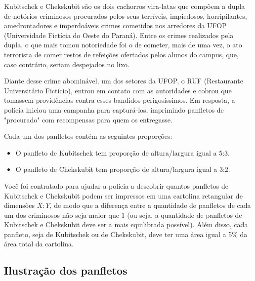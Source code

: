 Kubitschek e Chekskubit são os dois cachorros vira-latas que compõem a dupla de notórios criminosos procurados pelos seus terríveis, impiedosos, horripilantes, amedrontadores e imperdoáveis crimes cometidos nos arredores da UFOP (Universidade Fictícia do Oeste do Paraná). Entre os crimes realizados pela dupla, o que mais tomou notoriedade foi o de cometer, mais de uma vez, o ato terrorista de comer restos de refeições ofertados pelos alunos do campus, que, caso contrário, seriam despejados no lixo.

Diante desse crime abominável, um dos setores da UFOP, o RUF (Restaurante Universitário Fictício), entrou em contato com as autoridades e cobrou que tomassem providências contra esses bandidos perigosíssimos. Em resposta, a polícia iniciou uma campanha para capturá-los, imprimindo panfletos de "procurado" com recompensas para quem os entregasse.

Cada um dos panfletos contém as seguintes proporções:
\begin{itemize}
    \item O panfleto de Kubitschek tem proporção de altura/largura igual a 5:3.
    \item O panfleto de Chekskubit tem proporção de altura/largura igual a 3:2.
\end{itemize}

Você foi contratado para ajudar a polícia a descobrir quantos panfletos de Kubitschek e Chekskubit podem ser impressos em uma cartolina retangular de dimensões $X:Y$, de modo que a diferença entre a quantidade de panfletos de cada um dos criminosos não seja maior que 1 (ou seja, a quantidade de panfletos de Kubitschek e Chekskubit deve ser a mais equilibrada possível). Além disso, cada panfleto, seja de Kubitschek ou de Chekskubit, deve ter uma área igual a 5\% da área total da cartolina.

\subsection*{Ilustração dos panfletos}

